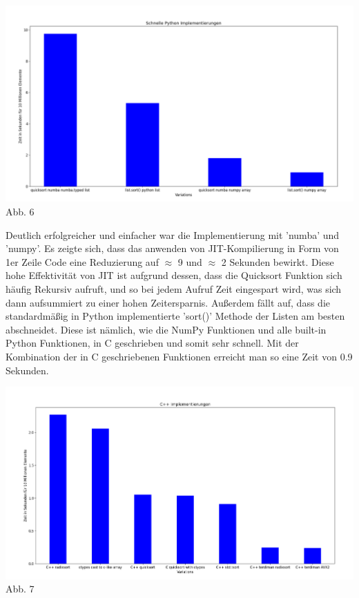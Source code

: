\documentclass[12pt,a4paper]{article}
\begin{document}
\begin{center}
    \hspace*{-3cm}\includegraphics[width=1.4\textwidth]{./diagramme/matplotlib/pythonschnell.png}
    Abb. 6
\end{center}

Deutlich erfolgreicher und einfacher war die Implementierung mit 'numba' und 'numpy'.
Es zeigte sich, dass das anwenden von JIT-Kompilierung in Form von 1er Zeile Code
eine Reduzierung auf $\approx$ 9 und $\approx$ 2 Sekunden bewirkt. Diese hohe Effektivität von JIT
ist aufgrund dessen, dass die Quicksort Funktion sich häufig Rekursiv aufruft, und so bei jedem Aufruf
Zeit eingespart wird, was sich dann aufsummiert zu einer hohen Zeitersparnis.
Außerdem fällt auf, dass die standardmäßig in Python implementierte 'sort()' Methode der Listen
am besten abschneidet. Diese ist nämlich, wie die NumPy Funktionen und alle built-in Python Funktionen, in C geschrieben und
somit sehr schnell. Mit der Kombination der in C geschriebenen Funktionen erreicht man so eine Zeit von 0.9 Sekunden.

\begin{center}
    \hspace*{-3cm}\includegraphics[width=1.4\textwidth]{./diagramme/matplotlib/cpp.png}
    Abb. 7
\end{center}
\end{document}
